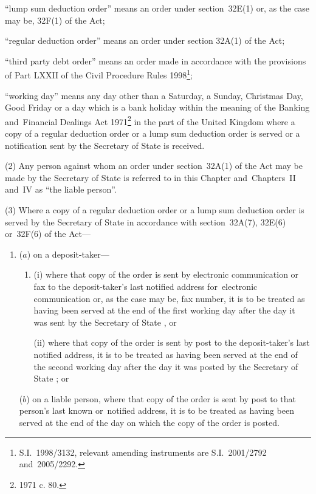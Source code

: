 \documentclass[12pt,a4paper]{article}
\begin{document}
\begin{enumerate}
“lump sum deduction order” means an order under section~32E(1) or, as the case may be, 32F(1) of the Act;

“regular deduction order” means an order under section 32A(1) of the Act;

“third party debt order” means an order made in accordance with the provisions of Part LXXII of the Civil Procedure Rules 1998\footnote{S.I.~1998/3132, relevant amending instruments are S.I.~2001/2792 and~2005/2292.};

“working day” means any day other than a Saturday, a Sunday, Christmas Day, Good Friday or a day which is a bank holiday within the meaning of the Banking and~Financial Dealings Act 1971\footnote{1971 c. 80.} in the part of the United Kingdom where a copy of a regular deduction order or a lump sum deduction order is served or a notification sent by the %
Secretary of State  %
is received.
\end{enumerate}

(2) Any person against whom an order under section~32A(1) of the Act may be made by the  %
Secretary of State  %
is referred to in this Chapter and~Chapters~II and~IV as “the liable person”.

(3) Where a copy of a regular deduction order or a lump sum deduction order is served by the  
Secretary of State  %
in accordance with section~32A(7), 32E(6) or~32F(6) of the Act—
\begin{enumerate}\item[]
($a$) on a deposit-taker—
\begin{enumerate}\item[]
(i) where that copy of the order is sent by electronic communication or fax to the deposit-taker’s last notified address for~electronic communication or, as the case may be, fax number, it is to be treated as having been served at the end of the first working day after the day it was sent by the 
Secretary of State%
, or

(ii) where that copy of the order is sent by post to the deposit-taker’s last notified address, it is to be treated as having been served at the end of the second working day after the day it was posted by the 
Secretary of State%
; or
\end{enumerate}

($b$) on a liable person, where that copy of the order is sent by post to that person’s last known or~notified address, it is to be treated as having been served at the end of the day on which the copy of the order is posted.
\end{enumerate}
\end{document}
